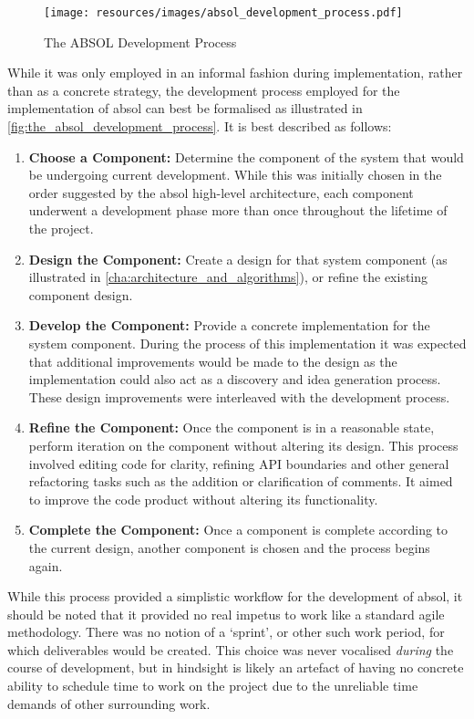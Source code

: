 \begin{figure}[!htb]
    \centering
    \texttt{[image: resources/images/absol\_development\_process.pdf]}
    \caption{The ABSOL Development Process}
    \label{fig:the_absol_development_process}
\end{figure}

While it was only employed in an informal fashion during implementation, rather than as a concrete strategy, the development process employed for the implementation of \gls{absol} can best be formalised as illustrated in \autoref{fig:the_absol_development_process}.
It is best described as follows:
\begin{enumerate}
    \item \textbf{Choose a Component:} Determine the component of the system that would be undergoing current development. 
    While this was initially chosen in the order suggested by the \gls{absol} high-level architecture, each component underwent a development phase more than once throughout the lifetime of the project.
    \item \textbf{Design the Component:} Create a design for that system component (as illustrated in \autoref{cha:architecture_and_algorithms}), or refine the existing component design.
    \item \textbf{Develop the Component:} Provide a concrete implementation for the system component.
    During the process of this implementation it was expected that additional improvements would be made to the design as the implementation could also act as a discovery and idea generation process.
    These design improvements were interleaved with the development process. 
    \item \textbf{Refine the Component:} Once the component is in a reasonable state, perform iteration on the component without altering its design.
    This process involved editing code for clarity, refining API boundaries and other general refactoring tasks such as the addition or clarification of comments. 
    It aimed to improve the code product without altering its functionality.
    \item \textbf{Complete the Component:} Once a component is complete according to the current design, another component is chosen and the process begins again.
\end{enumerate}

While this process provided a simplistic workflow for the development of \gls{absol}, it should be noted that it provided no real impetus to work like a standard agile methodology.
There was no notion of a `sprint', or other such work period, for which deliverables would be created.
This choice was never vocalised \textit{during} the course of development, but in hindsight is likely an artefact of having no concrete ability to schedule time to work on the project due to the unreliable time demands of other surrounding work. 

